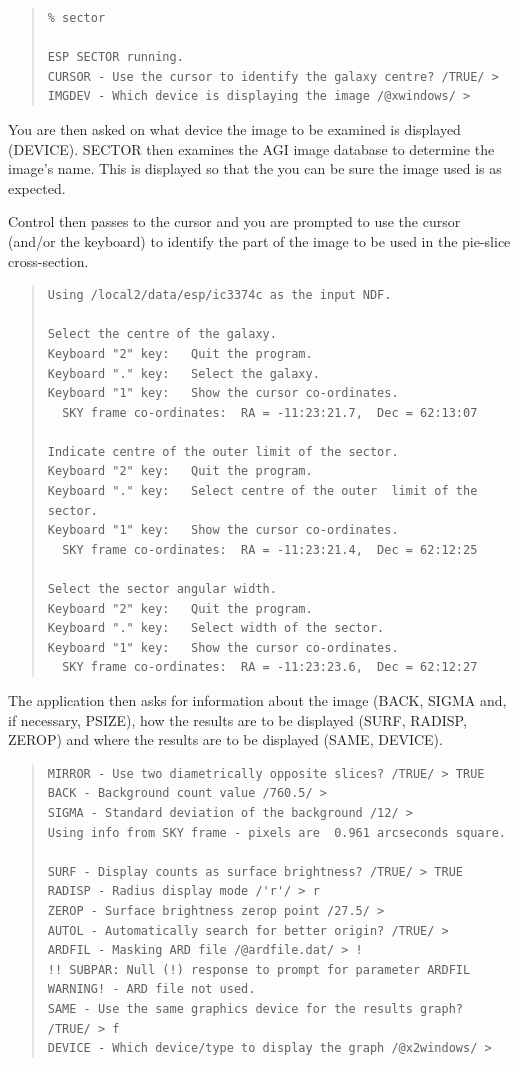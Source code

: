 \documentclass[twoside,11pt]{article}
\newenvironment{myquote}{\begin{quote}\begin{small}}{\end{small}\end{quote}}
\begin{document}
\begin{myquote}
\begin{verbatim}
% sector
 
ESP SECTOR running.
CURSOR - Use the cursor to identify the galaxy centre? /TRUE/ > 
IMGDEV - Which device is displaying the image /@xwindows/ > 
\end{verbatim}
\end{myquote}

You are then asked
on what device the image to be examined is displayed (DEVICE).
SECTOR then examines the AGI image database to determine the image's name.
This is displayed so that the you can be sure the image used is as expected.

Control then passes to the cursor and you are prompted to use the
cursor (and/or the keyboard) to identify the part of the image to be used in
the pie-slice cross-section.

\begin{myquote}
\begin{verbatim}
Using /local2/data/esp/ic3374c as the input NDF.

Select the centre of the galaxy.
Keyboard "2" key:   Quit the program.
Keyboard "." key:   Select the galaxy.
Keyboard "1" key:   Show the cursor co-ordinates.
  SKY frame co-ordinates:  RA = -11:23:21.7,  Dec = 62:13:07

Indicate centre of the outer limit of the sector.
Keyboard "2" key:   Quit the program.
Keyboard "." key:   Select centre of the outer  limit of the sector.
Keyboard "1" key:   Show the cursor co-ordinates.
  SKY frame co-ordinates:  RA = -11:23:21.4,  Dec = 62:12:25

Select the sector angular width.
Keyboard "2" key:   Quit the program.
Keyboard "." key:   Select width of the sector.
Keyboard "1" key:   Show the cursor co-ordinates.
  SKY frame co-ordinates:  RA = -11:23:23.6,  Dec = 62:12:27
\end{verbatim}
\end{myquote}

The application then asks 
for information about the image (BACK, SIGMA and, if necessary, PSIZE),
how the results are to be displayed (SURF, RADISP, ZEROP)
and where the results are to be displayed (SAME, DEVICE).

\begin{myquote}
\begin{verbatim}
MIRROR - Use two diametrically opposite slices? /TRUE/ > TRUE
BACK - Background count value /760.5/ > 
SIGMA - Standard deviation of the background /12/ > 
Using info from SKY frame - pixels are  0.961 arcseconds square.

SURF - Display counts as surface brightness? /TRUE/ > TRUE
RADISP - Radius display mode /'r'/ > r
ZEROP - Surface brightness zerop point /27.5/ > 
AUTOL - Automatically search for better origin? /TRUE/ > 
ARDFIL - Masking ARD file /@ardfile.dat/ > !
!! SUBPAR: Null (!) response to prompt for parameter ARDFIL
WARNING! - ARD file not used.
SAME - Use the same graphics device for the results graph? /TRUE/ > f
DEVICE - Which device/type to display the graph /@x2windows/ > 
\end{verbatim}
\end{myquote}
 
\end{document}
